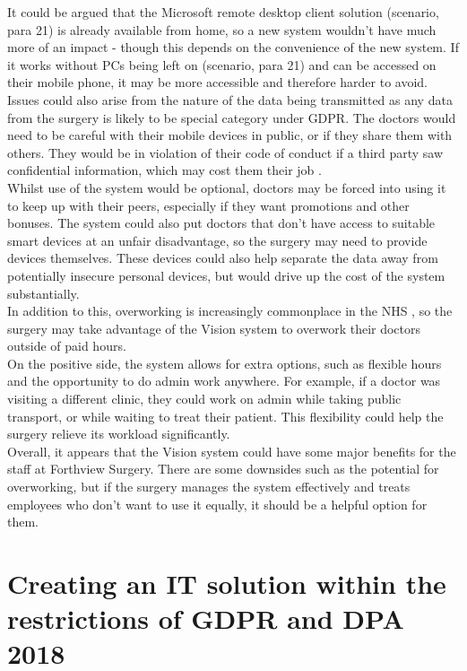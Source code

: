 \documentclass[12pt,a4paper]{article}
\begin{document}
It could be argued that the Microsoft remote desktop client solution (scenario, para 21) is already available from home, so a new system wouldn't have much more of an impact - though this depends on the convenience of the new system. If it works without PCs being left on (scenario, para 21) and can be accessed on their mobile phone, it may be more accessible and therefore harder to avoid.\\

Issues could also arise from the nature of the data being transmitted as any data from the surgery is likely to be special category under GDPR. The doctors would need to be careful with their mobile devices in public, or if they share them with others. They would be in violation of their code of conduct if a third party saw confidential information, which may cost them their job \cite{GMC}.\\

Whilst use of the system would be optional, doctors may be forced into using it to keep up with their peers, especially if they want promotions and other bonuses. The system could also put doctors that don't have access to suitable smart devices at an unfair disadvantage, so the surgery may need to provide devices themselves. These devices could also help separate the data away from potentially insecure personal devices, but would drive up the cost of the system substantially.\\ 

In addition to this, overworking is increasingly commonplace in the NHS \cite{overwork}, so the surgery may take advantage of the Vision system to overwork their doctors outside of paid hours.\\

On the positive side, the system allows for extra options, such as flexible hours and the opportunity to do admin work anywhere. For example, if a doctor was visiting a different clinic, they could work on admin while taking public transport, or while waiting to treat their patient. This flexibility could help the surgery relieve its workload significantly.\\

Overall, it appears that the Vision system could have some major benefits for the staff at Forthview Surgery. There are some downsides such as the potential for overworking, but if the surgery manages the system effectively and treats employees who don't want to use it equally, it should be a helpful option for them.

\section{Creating an IT solution within the restrictions of GDPR and DPA 2018}
\end{document}
